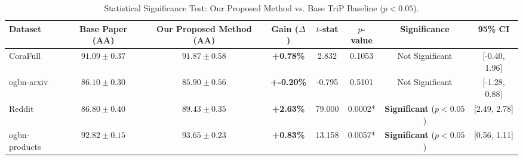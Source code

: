 \begin{table}[t]
\centering
\caption{Statistical Significance Test: Our Proposed Method vs. Base TriP Baseline ($p < 0.05$).}
\begin{tabular}{lccccccc}
\hline
\textbf{Dataset} & \textbf{Base Paper (AA)} & \textbf{Our Proposed Method (AA)} & \textbf{Gain ($\Delta$)} & \textbf{$t$-stat} & \textbf{$p$-value} & \textbf{Significance} & \textbf{95\% CI} \\
\hline
CoraFull & $91.09 \pm 0.37$ & $91.87 \pm 0.58$ & \textbf{+0.78\%} & 2.832 & 0.1053 & Not Significant & [-0.40, 1.96] \\
ogbn-arxiv & $86.10 \pm 0.30$ & $85.90 \pm 0.56$ & \textbf{+-0.20\%} & -0.795 & 0.5101 & Not Significant & [-1.28, 0.88] \\
Reddit & $86.80 \pm 0.40$ & $89.43 \pm 0.35$ & \textbf{+2.63\%} & 79.000 & 0.0002* & \textbf{Significant} ($p < 0.05$) & [2.49, 2.78] \\
ogbn-products & $92.82 \pm 0.15$ & $93.65 \pm 0.23$ & \textbf{+0.83\%} & 13.158 & 0.0057* & \textbf{Significant} ($p < 0.05$) & [0.56, 1.11] \\
\hline
\end{tabular}
\label{tab:statistical_significance_all}
\end{table}